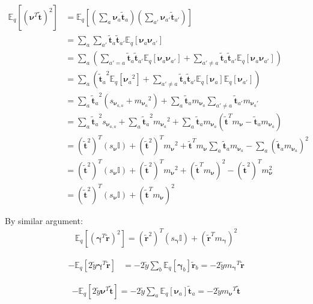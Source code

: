 \documentclass[letterpaper,12pt]{article}
\newcommand{\lp}{\left (} %
\newcommand{\rp}{\right )} %
\newcommand{\lb}{\left [} %
\newcommand{\rb}{\right ]} %
\newcommand{\nuv}{\boldsymbol{\nu}} %
\newcommand{\gammav}{\boldsymbol{\gamma}} %
\newcommand{\ytilde}{\ensuremath{\tilde{y}}} %
\newcommand{\ttilde}{\ensuremath{\tilde{\boldsymbol{t}}}} %
\newcommand{\rtilde}{\ensuremath{\tilde{\boldsymbol{r}}}} %
\newcommand{\mnu}{\ensuremath{m_\nuv}} %
\newcommand{\snu}{\ensuremath{s_\nuv}} %
\newcommand{\mgamma}{m_\gammav} %
\newcommand{\sgamma}{\ensuremath{s_\gammav}} %
\newcommand{\nua}{\ensuremath{\nuv_a}} %
\newcommand{\tatilde}{\ensuremath{\ttilde_a}} %
\newcommand{\nuaprime}{\ensuremath{\nuv_{a'}}} %
\newcommand{\taprimetilde}{\ensuremath{\ttilde_{a'}}} %
\newcommand{\rbtilde}{\ensuremath{\rtilde_b}} %
\newcommand{\mnusub}[1]{\ensuremath{m_{\nuv_#1}}} %
\newcommand{\E}{\mathbb{E}_q}
\begin{document}
\begin{equation}
\begin{split}
    \E \lb ( \nuv^T \ttilde)^2 \rb &= \E \lb \lp \sum_a \nua \tatilde \rp \lp \sum_{a'} \nuaprime \taprimetilde \rp \rb \\
    &= \sum_a \sum_{a'} \tatilde \taprimetilde \E \lb \nua \nuaprime \rb \\
    &= \sum_a \lp \sum_{a' = a}  \tatilde \taprimetilde \E \lb \nua \nuaprime \rb + \sum_{a' \neq a}  \tatilde \taprimetilde \E \lb \nua \nuaprime \rb \rp \\
    &= \sum_a \lp \tatilde^2 \E \lb \nua ^2 \rb + \sum_{a' \neq a} \tatilde \taprimetilde \E \lb \nua \rb \E \lb \nuaprime \rb \rp \\
    &= \sum_a \tatilde^2 \lp s_{\nuv_{a,a}} + \mnusub{a}^2 \rp + \sum_a  \tatilde \mnusub{a} \sum_{a' \neq a} \taprimetilde \mnusub{a'} \\
    &= \sum_a \tatilde^2  s_{\nuv_{a,a}} + \sum_a \tatilde^2 \mnusub{a}^2 + \sum_a \tatilde \mnusub{a} \lp \ttilde^T {\mnu} - \tatilde \mnusub{a} \rp \\
    &= (\ttilde^2)^T ({\snu} \mathbb{I}) + (\ttilde^2)^T {\mnu}^2 + \ttilde^T   m_{\nuv} \sum_a \tatilde \mnusub{a} - \sum_a (\tatilde \mnusub{a} )^2 \\
    &= (\ttilde^2)^T ({\snu} \mathbb{I}) + (\ttilde^2)^T {\mnu}^2 + (\ttilde^T   m_{\nuv})^2  - (\ttilde^2)^T m_{\nuv}^2  \\
    &= (\ttilde^2)^T ({\snu} \mathbb{I}) + (\ttilde^T   m_{\nuv})^2 
\end{split}
\end{equation}

By similar argument:
\begin{equation}
\begin{split}
    \E \lb \lp \gammav^T \rtilde \rp ^2 \rb =  (\rtilde^2)^T ({\sgamma} \mathbb{I}) + (\rtilde^T   m_{\gammav})^2 
\end{split}
\end{equation}

\begin{equation}
\begin{split}
    - \E \lb 2 \ytilde \gammav^T \rtilde \rb &= -2 \ytilde \sum_b \E \lb \gammav_b \rb \rbtilde = -2 \ytilde {\mgamma}^T \rtilde
\end{split}
\end{equation}

\begin{equation}
\begin{split}
        - \E \lb 2 \ytilde \nuv^T \ttilde \rb = -2 \ytilde \sum_a \E \lb \nua \rb  \tatilde = - 2 \ytilde {\mnu}^T \ttilde 
\end{split}
\end{equation}
\end{document}
